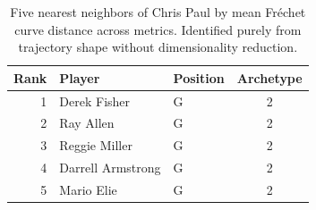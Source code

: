 \begin{table}[htbp]
  \centering\small
  \begin{tabular}{rllc}
    \toprule
    Rank & Player & Position & Archetype \\
    \midrule
    1 & Derek Fisher & G & 2 \\
    2 & Ray Allen & G & 2 \\
    3 & Reggie Miller & G & 2 \\
    4 & Darrell Armstrong & G & 2 \\
    5 & Mario Elie & G & 2 \\
    \bottomrule
  \end{tabular}
  \caption{Five nearest neighbors of Chris Paul by mean Fr\'{e}chet curve distance across metrics. Identified purely from trajectory shape without dimensionality reduction.}
  \label{tab:Chris_Paul_frechet_curve_neighbors}
\end{table}

